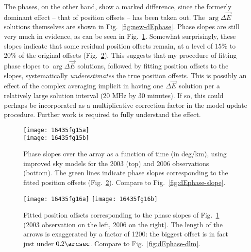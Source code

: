 \documentclass{aa}
\newcommand{\jones}[2]{\vec {#1}_{#2}}
\begin{document}
The phases, on the other hand, show a marked difference, since the formerly dominant effect -- that of position offsets -- has been taken out. The $\arg\Delta\jones{E}{}$ solutions themselves are shown in Fig.~\ref{fig:new-dEphase}. Phase slopes are still very much in evidence, as can be seen in Fig.~\ref{fig:new-dEphase-slope}. Somewhat surprisingly, these slopes indicate that some residual position offsets remain, at a level of 15\% to 20\% of the original offsets (Fig.~\ref{fig:new-dEphase-dlm}). This suggests that my procedure of fitting phase slopes to $\arg\Delta\jones{E}{}$ solutions, followed by fitting position offsets to the slopes, systematically \emph{underestimates} the true position offsets. This is possibly an effect of the complex averaging implicit in having one $\Delta\jones{E}{}$ solution per a relatively large solution interval (20 MHz by 30 minutes). If so, this could perhaps be incorporated as a multiplicative correction factor in the model update procedure. Further work is required to fully understand the effect. 


\begin{figure}
\centering
\texttt{[image: 16435fg15a]}\\
\texttt{[image: 16435fg15b]}
\caption{\label{fig:new-dEphase-slope}Phase slopes over the array as a function of time (in deg/km), using improved sky models for the 2003 (top) and 2006 observations (bottom). The green lines indicate phase slopes corresponding to the fitted position offsets (Fig.~\ref{fig:new-dEphase-dlm}). Compare to Fig.~\ref{fig:dEphase-slope}.}
\end{figure}

\begin{figure}
\centering
\texttt{[image: 16435fg16a]}%
\texttt{[image: 16435fg16b]}
\caption{\label{fig:new-dEphase-dlm}Fitted position offsets corresponding to the phase slopes of Fig.~\ref{fig:new-dEphase-slope} (2003 observation on the left, 2006 on the right). The length of the arrows is exaggerated by a factor of 1200: the biggest offset is in fact just under $0.2\arcsec$. Compare to Fig.~\ref{fig:dEphase-dlm}.}
\end{figure}
\end{document}
